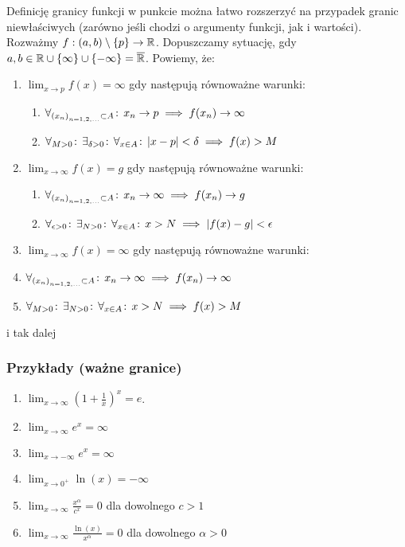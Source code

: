 \documentclass[9pt]{article}
\begin{document}
\begin{Def}
    Definicję granicy funkcji w punkcie można łatwo rozszerzyć na przypadek granic niewłaściwych
    (zarówno jeśli chodzi o argumenty funkcji, jak i wartości). Rozważmy $f: (a,b) \setminus \{p\}
    \to \mathbb{R}$. Dopuszczamy sytuację, gdy $a, b \in \mathbb{R} \cup \{\infty\} \cup \{-\infty\} =
    \overline{\mathbb{R}}$. Powiemy, że:
    \begin{enumerate}
        \item $\lim_{x \to p} f(x) = \infty$ gdy następują równoważne warunki:
            \begin{enumerate}
                \item $\forall_{\left(x_n\right)_{n = 1,2,...} \subset A} \! : \, x_n \to p \implies f(x_n) \to \infty$
                \item $\forall_{M > 0} \! : \, \exists_{\delta > 0} \! : \, \forall_{x \in A} \! : \, |x-p| < \delta \implies f(x) > M$
            \end{enumerate}
        \item $\lim_{x \to \infty} f(x) = g$ gdy następują równoważne warunki:
            \begin{enumerate}
                \item $\forall_{\left(x_n\right)_{n = 1,2,...} \subset A} \! : \, x_n \to \infty \implies f(x_n) \to g$
                \item $\forall_{\epsilon > 0} \! : \, \exists_{N > 0} \! : \, \forall_{x \in A} \! : \, x > N \implies |f(x)-g| < \epsilon$
            \end{enumerate}
        \item $\lim_{x \to \infty} f(x) = \infty$ gdy następują równoważne warunki:
                \item $\forall_{\left(x_n\right)_{n = 1,2,...} \subset A} \! : \, x_n \to \infty \implies f(x_n) \to \infty$
                \item $\forall_{M > 0} \! : \, \exists_{N > 0} \! : \, \forall_{x \in A} \! : \, x > N \implies f(x) > M$
    \end{enumerate}
    i tak dalej
\end{Def}

\subsubsection*{Przykłady (ważne granice)}

\begin{enumerate}
    \item $\lim_{x \to \infty}\left(1 + \frac{1}{x}\right)^x = e$.
    \item $\lim_{x \to \infty} e^x = \infty$
    \item $\lim_{x \to -\infty} e^x = \infty$
    \item $\lim_{x \to 0^+} \ln(x) = -\infty$
    \item $\lim_{x \to \infty} \frac{x^\alpha}{c^x} = 0$ dla dowolnego $c > 1$
    \item $\lim_{x \to \infty} \frac{\ln(x)}{x^\alpha} = 0$ dla dowolnego $\alpha > 0$
\end{enumerate}
\end{document}
